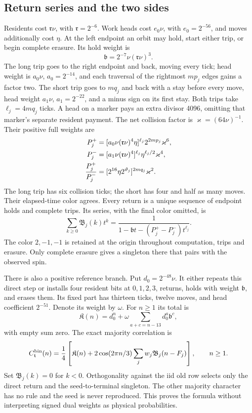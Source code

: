 \subsection{Return series and the two sides}\label{sec:binary-returns}

Residents cost \(\mathfrak r\nu\), with \(\mathfrak r=2^{-6}\). Work heads cost \(e_0\nu\), with \(e_0=2^{-56}\), and moves additionally cost \(\eta\). At the left endpoint an orbit may hold, start either trip, or begin complete erasure. Its hold weight is
\[
 \mathfrak b=2^{-7}\nu(\mathfrak r\nu)^3.
\]
The long trip goes to the right endpoint and back, moving every tick; head weight is \(a_0\nu\), \(a_0=2^{-14}\), and each traversal of the rightmost \(mp_j\) edges gains a factor two. The short trip goes to \(mq_j\) and back with a stay before every move, head weight \(a_1\nu\), \(a_1=2^{-22}\), and a minus sign on its first stay. Both trips take \(\ell_j=4mq_j\) ticks. A head on a marker pays an extra divisor 4096, omitting that marker's separate resident payment. The net collision factor is \(\varkappa=(64\nu)^{-1}\). Their positive full weights are
\begin{align}
 P_j^+&=[a_0\nu(\mathfrak r\nu)^4\eta]^{\ell_j}
             2^{2mp_j}\varkappa^6,\notag\\
 P_j^-&=[a_1\nu(\mathfrak r\nu)^4]^{\ell_j}
             \eta^{\ell_j/2}\varkappa^4,\label{eq:binary-trips}\\
 \frac{P_j^+}{P_j^-}&=[2^{16}\eta2^{\vartheta_j}]^{2mq_j}\varkappa^2.\notag
\end{align}
The long trip has six collision ticks; the short has four and half as many moves. Their elapsed-time color agrees. Every return is a unique sequence of endpoint holds and complete trips. Its series, with the final color omitted, is
\begin{equation}\label{eq:binary-return}
 \sum_{k\ge0}\mathfrak B_j(k)t^k
 =\frac1{1-\mathfrak b t-(P_j^+-P_j^-)t^{\ell_j}}.
\end{equation}
The color \(2,-1,-1\) is retained at the origin throughout computation, trips and erasure. Only complete erasure gives a singleton there that pairs with the observed spin.

There is also a positive reference branch. Put \(d_0=2^{-48}\nu\). It either repeats this direct step or installs four resident bits at \(0,1,2,3\), returns, holds with weight \(\mathfrak b\), and erases them. Its fixed part has thirteen ticks, twelve moves, and head coefficient \(2^{-51}\). Denote its weight by \(\omega\). For \(n\ge1\) its total is
\[
 \mathfrak K(n)=d_0^n+\omega
       \sum_{a+c=n-13}d_0^a\mathfrak b^c,
\]
with empty sum zero. The exact majority correlation is
\begin{equation}\label{eq:binary-correlation}
 C^{\rm bin}_{\mathfrak t}(n)=\frac14\left[
 \mathfrak K(n)+2\cos(2\pi n/3)
 \sum_j w_j\mathfrak B_j(n-F_j)\right],\qquad n\ge1.
\end{equation}
Set \(\mathfrak B_j(k)=0\) for \(k<0\). Orthogonality against the iid old row selects only the direct return and the seed-to-terminal singleton. The other majority character has no rule and the seed is never reproduced. This proves the formula without interpreting signed dual weights as physical probabilities.

